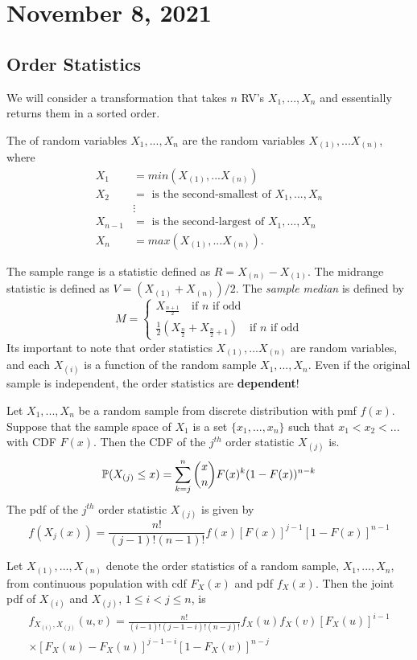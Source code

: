 \section{November 8, 2021}
\subsection{Order Statistics}
We will consider a transformation that takes  $n$ RV's $X_1,...,X_n$ and essentially returns them in a sorted order. 
\begin{definition}
The  of random variables $X_1,...,X_n$ are the random variables $X_{(1)},...X_{(n)}$, where
\begin{align*}
X_{1} & = min(X_{(1)},...X_{(n)})\\
X_{2} & = \text{ is the second-smallest of } X_1,...,X_n \\
& \vdots \\
X_{n-1} & = \text{ is the second-largest of } X_1,...,X_n \\
X_{n} & = max(X_{(1)},...X_{(n)}).
\end{align*}
\end{definition}
The sample range is a statistic defined as $R = X_{(n)} - X_{(1)}$. The midrange statistic is defined as $V = (X_{(1)} + X_{(n)})/2$. The \textit{sample median} is defined by
$$
M = 
\begin{cases}
    X_{\frac{n+1}{2}} \quad \text{if } n \text{ if odd} \\
   \frac{1}{2}(X_{\frac{n}{2}} + X_{\frac{n}{2} + 1} ) \quad \text{if } n \text{ if odd}
\end{cases}
$$
Its important to note that order statistics $X_{(1)},...X_{(n)}$ are random variables, and each $X_{(i)}$ is a function of the random sample $X_1,...,X_n$. Even if the original sample is independent, the order statistics are \textbf{dependent}! 
\begin{theorem}
Let $X_1,...,X_n$ be a random sample from discrete distribution with pmf $f(x)$. Suppose that the sample space of $X_1$ is a set $\{x_1,...,x_n \}$ such that $x_1 < x_2 < ...$ with CDF $F(x)$. Then the CDF of the $j^{th}$ order statistic $X_{(j)}$ is. 
$$
\mathbb P(X_{(j)} \leq x) = \sum_{k=j}^{n} {x \choose n} F(x) ^{k}(1 - F(x))^{n-k}
$$
The pdf of the $j^{th}$ order statistic $X_{(j)}$ is given by 
$$
f(X_{j}(x)) = \frac{n!}{(j-1)!(n-1)!}f(x)[F(x)]^{j-1}[1-F(x)]^{n-1}
$$
\end{theorem}
Let $X_{(1)},...,X_{(n)}$ denote the order statistics of a random sample, $X_1,...,X_n$, from continuous population with cdf $F_X(x)$ and pdf $f_X(x)$. Then the joint pdf of $X_{(i)}$ and $X_{(j)}$, $1 \leq i < j \leq n$, is 
\begin{align*}
    f_{X_{(i)},X_{(j)}}(u,v) = \frac{n!}{(i-1)!(j-1-i)! (n-j)!}
f_{X}(u)f_X(v)[F_X(u)]^{i-1} \\
\times [F_X(u) - F_X(u)]^{j-1-i}[1-F_X(v)]^{n-j}
\end{align*}
 


